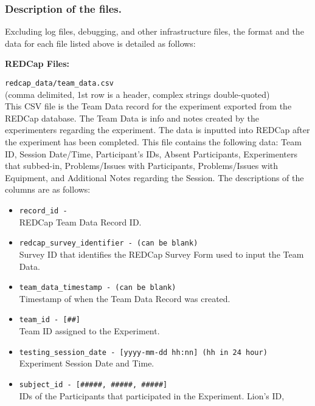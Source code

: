 \subsubsection{Description of the files.}

\noindent
Excluding log files, debugging, and other infrastructure files, the format and
the data for each file listed above is detailed as follows: \\


\begin{description}
    \item\textbf{REDCap Files:}
\medskip
    \item\verb|redcap_data/team_data.csv|\\
    (comma delimited, 1st row is a header, complex strings double-quoted)\\
    This CSV file is the Team Data record for the experiment exported from the
    REDCap database. The Team Data is info and notes created by the
    experimenters regarding the experiment. The data is inputted into REDCap
    after the experiment has been completed. This file contains the following
    data: Team ID, Session Date/Time, Participant's IDs, Absent
    Participants, Experimenters that subbed-in, Problems/Issues with
    Participants, Problems/Issues with Equipment, and Additional Notes
    regarding the Session. The descriptions of the columns are as follows:
\begin{itemize}
    \item \verb|record_id -|\\
		REDCap Team Data Record ID.
    \item \verb|redcap_survey_identifier - (can be blank)|\\
        Survey ID that identifies the REDCap Survey Form used to input the Team Data.
    \item \verb|team_data_timestamp - (can be blank)|\\
		Timestamp of when the Team Data Record was created.
    \item \verb|team_id - [##]|\\
		Team ID assigned to the Experiment.
    \item \verb|testing_session_date - [yyyy-mm-dd hh:nn] (hh in 24 hour)|\\
		Experiment Session Date and Time.
    \item \verb|subject_id - [#####, #####, #####]|\\
        IDs of the Participants that participated in the Experiment. Lion's ID,

\end{itemize}
\end{description}
